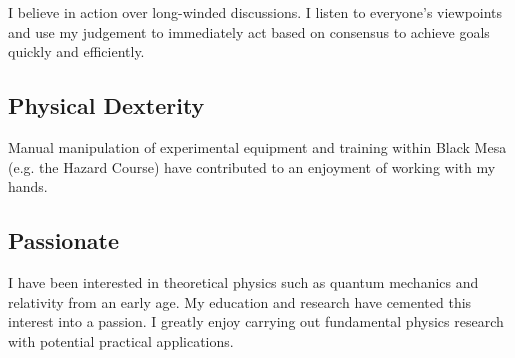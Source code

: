 \documentclass[10pt]{FreemanCV}
\begin{document}
\begin{paracol}{2}
I believe in action over long-winded discussions. I listen to everyone's
viewpoints and use my judgement to immediately act based on consensus to
achieve goals quickly and efficiently.

\subsection{Physical Dexterity}

Manual manipulation of experimental equipment and training within Black Mesa
(e.g. the Hazard Course) have contributed to an enjoyment of working with my
hands.

\subsection{Passionate}

I have been interested in theoretical physics such as quantum mechanics and
relativity from an early age. My education and research have cemented this
interest into a passion. I greatly enjoy carrying out fundamental physics
research with potential practical applications.


\end{paracol} %

\end{document}
